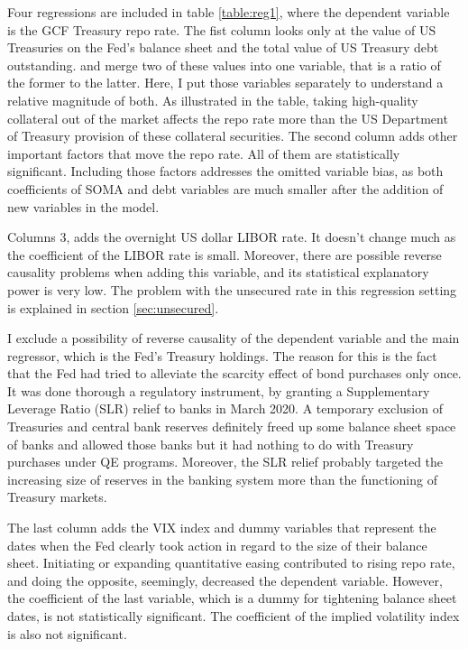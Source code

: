 \documentclass[11pt,a4paper,english,oneside]{article}
\begin{document}
Four regressions are included in table \ref{table:reg1}, where the dependent variable is the GCF Treasury repo rate. The fist column looks only at the value of US Treasuries on the Fed's balance sheet and the total value of US Treasury debt outstanding. \citet{damico2014} and \citet{arrata2018} merge two of these values into one variable, that is a ratio of the former to the latter. Here, I put those variables separately to understand a relative magnitude of both. As illustrated in the table, taking high-quality collateral out of the market affects the repo rate more than the US Department of Treasury provision of these collateral securities. The second column adds other important factors that move the repo rate. All of them are statistically significant. Including those factors addresses the omitted variable bias, as both coefficients of SOMA and debt variables are much smaller after the addition of new variables in the model.

Columns 3, adds the overnight US dollar LIBOR rate. It doesn't change much as the coefficient of the LIBOR rate is small. Moreover, there are possible reverse causality problems when adding this variable, and its statistical explanatory power is very low. The problem with the unsecured rate in this regression setting is explained in section \ref{sec:unsecured}.

I exclude a possibility of reverse causality of the dependent variable and the main regressor, which is the Fed's Treasury holdings. The reason for this is the fact that the Fed had tried to alleviate the scarcity effect of bond purchases only once. It was done thorough a regulatory instrument, by granting a Supplementary Leverage Ratio (SLR) relief to banks in March 2020. A temporary exclusion of Treasuries and central bank reserves definitely freed up some balance sheet space of banks and allowed those banks but it had nothing to do with Treasury purchases under QE programs. Moreover, the SLR relief probably targeted the increasing size of reserves in the banking system more than the functioning of Treasury markets.

The last column adds the VIX index and  dummy variables that represent the dates when the Fed clearly took action in regard to the size of their balance sheet. Initiating or expanding quantitative easing contributed to rising repo rate, and doing the opposite, seemingly, decreased the dependent variable. However, the coefficient of the last variable, which is a dummy for tightening balance sheet dates, is not statistically significant. The coefficient of the implied volatility index is also not significant.
\end{document}
